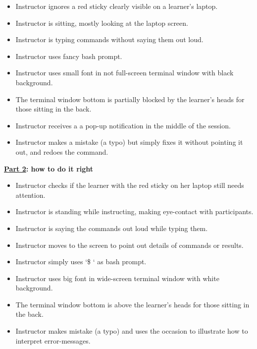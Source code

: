 \begin{itemize}

\item
  Instructor ignores a red sticky clearly visible on a learner's
  laptop.

\item
  Instructor is sitting, mostly looking at the laptop screen.

\item
  Instructor is typing commands without saying them out loud.

\item
  Instructor uses fancy bash prompt.

\item
  Instructor uses small font in not full-screen terminal window with
  black background.

\item
  The terminal window bottom is partially blocked by the learner's
  heads for those sitting in the back.

\item
  Instructor receives a a pop-up notification in the middle of the
  session.

\item
  Instructor makes a mistake (a typo) but simply fixes it without
  pointing it out, and redoes the command.

\end{itemize}

\noindent
\textbf{\href{https://youtu.be/SkPmwe\_WjeY}{Part 2}: how to do it right}

\begin{itemize}

\item
  Instructor checks if the learner with the red sticky on her laptop
  still needs attention.

\item
  Instructor is standing while instructing, making eye-contact with
  participants.

\item
  Instructor is saying the commands out loud while typing them.

\item
  Instructor moves to the screen to point out details of commands or
  results.

\item
  Instructor simply uses `\$ ` as bash prompt.

\item
  Instructor uses big font in wide-screen terminal window with white
  background.

\item
  The terminal window bottom is above the learner's heads for those
  sitting in the back.

\item
  Instructor makes mistake (a typo) and uses the occasion to
  illustrate how to interpret error-messages.

\end{itemize}

